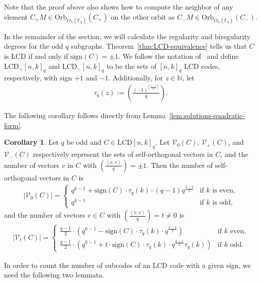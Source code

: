 \documentclass[11pt]{article}
\theoremstyle{definition}
\newtheorem{corollary}[theorem]{Corollary}
\newcommand{\F}{\mathbb{F}}
\newcommand{\N}{\mathbb{N}}
\newcommand{\Leg}[2]{\left(\frac{#1}{#2}\right)}                       %
\newcommand{\Orb}{\mathrm{Orb}}
\newcommand{\Sign}{\mathrm{sign}}
\newcommand{\Abs}[1]{\left|#1\right|}
\newcommand{\Ang}[1]{\left\langle#1\right\rangle}
\newcommand{\LCDpq}[2]{\mathrm{LCD}_+ {[#1, #2]}_q}
\newcommand{\LCDnq}[2]{\mathrm{LCD}_- {[#1, #2]}_q}
\newcommand{\LCDq}[2]{\mathrm{LCD} {[#1, #2]}_q}
\newcommand{\CurV}{\mathcal{V}}
\newcommand{\Ort}{O}
\newcommand{\Tauq}[1]{\tau_q (#1)}
\begin{document}
Note that the proof above also shows how to compute the neighbor of any element $C_+ M \in \Orb_{\Ort_n(\F_q)}(C_+)$ on the other orbit as $C_- M \in \Orb_{\Ort_n(\F_q)}(C_-)$.

In the remainder of the section, we will calculate the regularity and biregularity degrees for the odd $q$ subgraphs.
Theorem~\ref{thm:LCD-equivalence} tells us that $C$ is LCD if and only if $\Sign(C) = \pm 1$.
We follow the notation of~\cite{CMTQ18} and define $\LCDpq{n}{k}$ and $\LCDnq{n}{k}$ to be the sets of ${[n, k]}_q$ LCD codes, respectively, with sign $+1$ and $-1$. 
Additionally, for $z \in \N$, let
\begin{align*}
	\Tauq{z} := \Leg{{(-1)}^{\left\lceil \frac{z - 1}{2} \right\rceil}}{q}.
\end{align*}

The following corollary follows directly from Lemma~\ref{lem:solutions-quadratic-form}.

\begin{corollary}\label{cor:signed-vectors}
	Let $q$ be odd and $C \in \LCDq{n}{k}$.
	Let $\CurV_0(C)$, $\CurV_+(C)$, and $\CurV_-(C)$ respectively represent the sets of self-orthogonal vectors in $C$, and the number of vectors $v$ in $C$ with $\Leg{\Ang{v, v}}{q} = \pm 1$.
	Then the number of self-orthogonal vectors in $C$ is
	\begin{align*}
		\Abs{\CurV_0(C)} = 
		\begin{cases}
			q^{k - 1} + \Sign(C) \cdot \Tauq{k} \cdot (q - 1) q^{\frac{k - 2}{2}}
			&\text{if $k$ is even,} \\
			q^{k - 1}
			&\text{if $k$ is odd,}
		\end{cases}
	\end{align*}
	and the number of vectors $v \in C$ with $\Leg{\Ang{v, v}}{q} = t \neq 0$ is
	\begin{align*}
		\Abs{\CurV_t(C)} = 
		\begin{cases}
			\frac{q - 1}{2} \cdot
			\left( q^{k - 1} - \Sign(C) \cdot \Tauq{k} \cdot q^{\frac{k - 2}{2}} \right)
			&\text{if $k$ even,} \\
			\frac{q - 1}{2} \cdot
			\left( q^{k - 1} + t \cdot \Sign(C) \cdot \Tauq{k} \cdot q^{\frac{k - 1}{2}} \Tauq{k} \right)
			&\text{if $k$ odd.}
		\end{cases}
	\end{align*}
\end{corollary}

In order to count the number of subcodes of an LCD code with a given sign, we need the following two lemmata.
\end{document}
